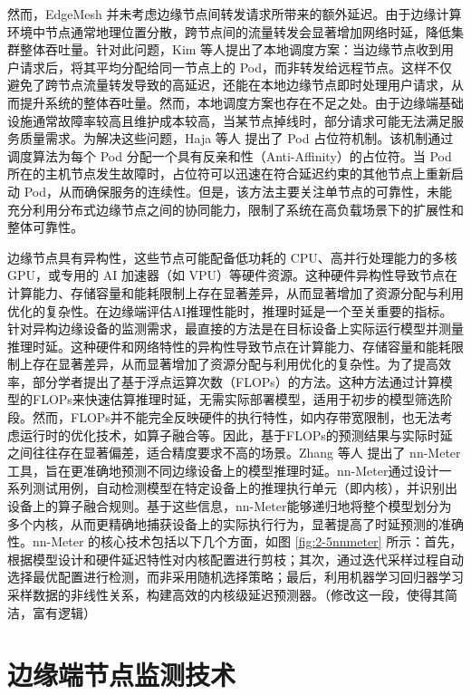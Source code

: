 然而，EdgeMesh 并未考虑边缘节点间转发请求所带来的额外延迟。由于边缘计算环境中节点通常地理位置分散，跨节点间的流量转发会显著增加网络时延，降低集群整体吞吐量。针对此问题，Kim 等人\cite{kim2023local}提出了本地调度方案：当边缘节点收到用户请求后，将其平均分配给同一节点上的 Pod，而非转发给远程节点。这样不仅避免了跨节点流量转发导致的高延迟，还能在本地边缘节点即时处理用户请求，从而提升系统的整体吞吐量。然而，本地调度方案也存在不足之处。由于边缘端基础设施通常故障率较高且维护成本较高，当某节点掉线时，部分请求可能无法满足服务质量需求。为解决这些问题，Haja 等人\cite{haja2019sharpening} 提出了 Pod 占位符机制。该机制通过调度算法为每个 Pod 分配一个具有反亲和性（Anti-Affinity）的占位符。当 Pod 所在的主机节点发生故障时，占位符可以迅速在符合延迟约束的其他节点上重新启动 Pod，从而确保服务的连续性。但是，该方法主要关注单节点的可靠性，未能充分利用分布式边缘节点之间的协同能力，限制了系统在高负载场景下的扩展性和整体可靠性。



边缘节点具有异构性，这些节点可能配备低功耗的 CPU、高并行处理能力的多核 GPU，或专用的 AI 加速器（如 VPU）等硬件资源。这种硬件异构性导致节点在计算能力、存储容量和能耗限制上存在显著差异，从而显著增加了资源分配与利用优化的复杂性。在边缘端评估AI推理性能时，推理时延是一个至关重要的指标。针对异构边缘设备的监测需求，最直接的方法是在目标设备上实际运行模型并测量推理时延。这种硬件和网络特性的异构性导致节点在计算能力、存储容量和能耗限制上存在显著差异，从而显著增加了资源分配与利用优化的复杂性。为了提高效率，部分学者\cite{he2018amc,tan2019mnasnet}提出了基于浮点运算次数（FLOPs）的方法。这种方法通过计算模型的FLOPs来快速估算推理时延，无需实际部署模型，适用于初步的模型筛选阶段。然而，FLOPs并不能完全反映硬件的执行特性，如内存带宽限制，也无法考虑运行时的优化技术，如算子融合等。因此，基于FLOPs的预测结果与实际时延之间往往存在显著偏差，适合精度要求不高的场景。Zhang 等人\cite{zhang2021nn} 提出了 nn-Meter 工具，旨在更准确地预测不同边缘设备上的模型推理时延。nn-Meter通过设计一系列测试用例，自动检测模型在特定设备上的推理执行单元（即内核），并识别出设备上的算子融合规则。基于这些信息，nn-Meter能够递归地将整个模型划分为多个内核，从而更精确地捕获设备上的实际执行行为，显著提高了时延预测的准确性。nn-Meter 的核心技术包括以下几个方面，如图 \ref{fig:2-5nnmeter} 所示：首先，根据模型设计和硬件延迟特性对内核配置进行剪枝；其次，通过迭代采样过程自动选择最优配置进行检测，而非采用随机选择策略；最后，利用机器学习回归器学习采样数据的非线性关系，构建高效的内核级延迟预测器。（修改这一段，使得其简洁，富有逻辑）



\section{边缘端节点监测技术}

